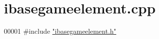 \hypertarget{a00044_source}{}\section{ibasegameelement.\+cpp}
\label{a00044_source}

\begin{DoxyCode}
00001 \textcolor{preprocessor}{#}\textcolor{preprocessor}{include} \hyperlink{a00047}{"ibasegameelement.h"}
\end{DoxyCode}
